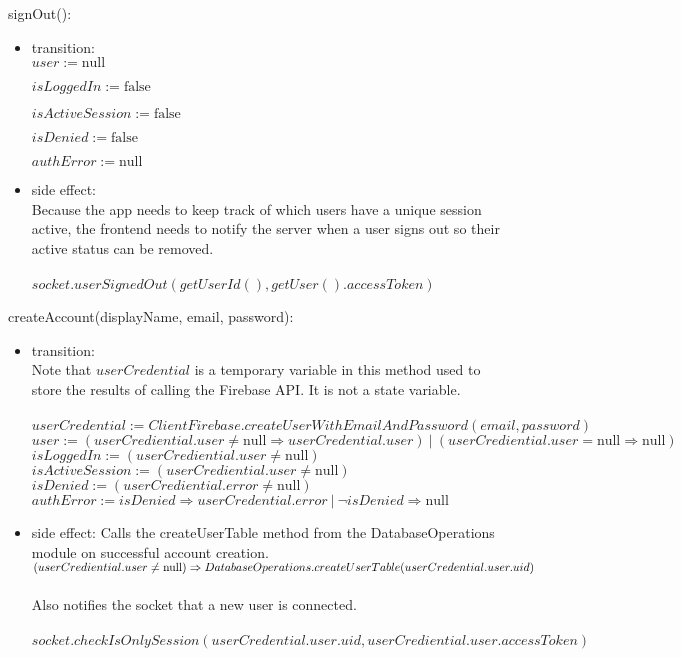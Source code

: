 \documentclass[12pt, titlepage]{article}
\begin{document}
\noindent signOut():
\begin{itemize}
\item transition: \\
$user := \text{null}$ 

$isLoggedIn := \text{false}$ 

$isActiveSession := \text{false}$

$isDenied := \text{false}$

$authError := \text{null}$

\item side effect: \\
Because the app needs to keep track of which users have a unique session active, the frontend needs to notify the server when a user signs out so their active status can be removed. \\ \\
$socket.userSignedOut(getUserId(), getUser().accessToken)$

\end{itemize}

\noindent createAccount(displayName, email, password):
\begin{itemize}
\item transition: \\ 
Note that $userCredential$ is a temporary variable in this method used to store the results of calling the Firebase API. It is not a state variable. \\ \\
$userCredential :=  ClientFirebase.createUserWithEmailAndPassword(email, password)$ \\

$user := (userCrediential.user \neq \text{null} \Rightarrow userCredential.user) \ | \ (userCrediential.user = \text{null} \Rightarrow \text{null})$ \\

$isLoggedIn := (userCrediential.user \neq \text{null})$ \\

$isActiveSession := (userCrediential.user \neq \text{null})$ \\

$isDenied := (userCrediential.error \neq \text{null})$ \\

$authError := isDenied \Rightarrow userCredential.error \ | \ \lnot isDenied \Rightarrow \text{null} $

\item side effect: Calls the createUserTable method from the DatabaseOperations module on successful account creation. \\

$(userCrediential.user \neq \text{null}) \Rightarrow \\
DatabaseOperations.createUserTable(userCredential.user.uid)$ \\
\\ Also notifies the socket that a new user is connected. \\ 
\\ $socket.checkIsOnlySession(userCredential.user.uid, userCrediential.user.accessToken)$

\end{itemize}
\end{document}
